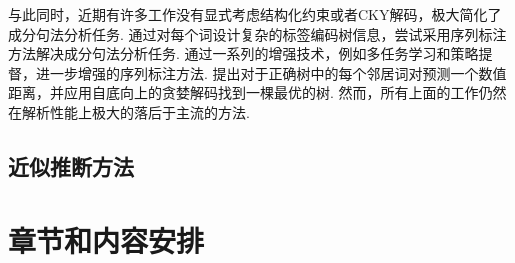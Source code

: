 与此同时，近期有许多工作没有显式考虑结构化约束或者CKY解码，极大简化了成分句法分析任务.
\citet{gomez-rodriguez-vilares-2018-constituent}通过对每个词设计复杂的标签编码树信息，尝试采用序列标注方法解决成分句法分析任务.
\citet{vilares-etal-2019-better}通过一系列的增强技术，例如多任务学习和策略提督，进一步增强的序列标注方法.
\citet{shen-etal-2018-straight}提出对于正确树中的每个邻居词对预测一个数值距离，并应用自底向上的贪婪解码找到一棵最优的树.
然而，所有上面的工作仍然在解析性能上极大的落后于主流的方法.

\subsection{近似推断方法}

\section{章节和内容安排}
